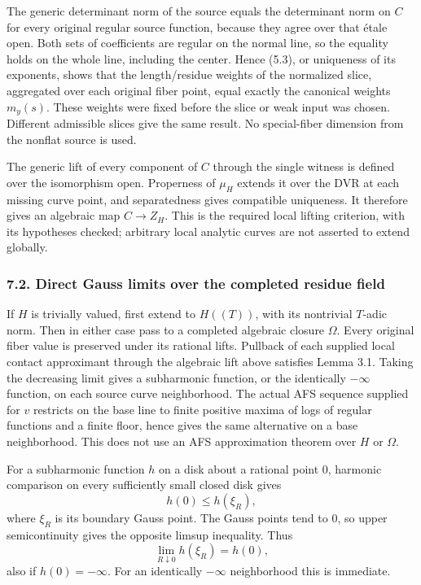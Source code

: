 \documentclass[
  10pt,
]{article}
\begin{document}
The generic determinant norm of the source equals the determinant norm
on \(C\) for every original regular source function, because they agree
over that étale open. Both sets of coefficients are regular on the
normal line, so the equality holds on the whole line, including the
center. Hence (5.3), or uniqueness of its exponents, shows that the
length/residue weights of the normalized slice, aggregated over each
original fiber point, equal exactly the canonical weights \(m_y(s)\).
These weights were fixed before the slice or weak input was chosen.
Different admissible slices give the same result. No special-fiber
dimension from the nonflat source is used.

The generic lift of every component of \(C\) through the single witness
is defined over the isomorphism open. Properness of \(\mu_H\) extends it
over the DVR at each missing curve point, and separatedness gives
compatible uniqueness. It therefore gives an algebraic map \(C\to Z_H\).
This is the required local lifting criterion, with its hypotheses
checked; arbitrary local analytic curves are not asserted to extend
globally.

\subsubsection{7.2. Direct Gauss limits over the completed residue
field}\label{direct-gauss-limits-over-the-completed-residue-field}

If \(H\) is trivially valued, first extend to \(H((T))\), with its
nontrivial \(T\)-adic norm. Then in either case pass to a completed
algebraic closure \(\Omega\). Every original fiber value is preserved
under its rational lifts. Pullback of each supplied local contact
approximant through the algebraic lift above satisfies Lemma 3.1. Taking
the decreasing limit gives a subharmonic function, or the identically
\(-\infty\) function, on each source curve neighborhood. The actual AFS
sequence supplied for \(v\) restricts on the base line to finite
positive maxima of logs of regular functions and a finite floor, hence
gives the same alternative on a base neighborhood. This does not use an
AFS approximation theorem over \(H\) or \(\Omega\).

For a subharmonic function \(h\) on a disk about a rational point \(0\),
harmonic comparison on every sufficiently small closed disk gives
\[h(0)\le h(\xi_R),\] where \(\xi_R\) is its boundary Gauss point. The
Gauss points tend to \(0\), so upper semicontinuity gives the opposite
limsup inequality. Thus \[\lim_{R\downarrow0}h(\xi_R)=h(0),\tag{7.2}\]
also if \(h(0)=-\infty\). For an identically \(-\infty\) neighborhood
this is immediate.
\end{document}

